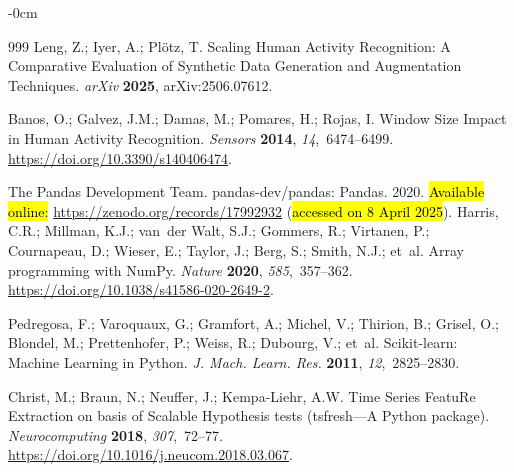 \documentclass[sensors,article,accept,pdftex,moreauthors]{Definitions/mdpi}
\begin{document}
\begin{adjustwidth}{-\extralength}{0cm}
\begin{thebibliography}{999}
Leng, Z.; Iyer, A.; Pl{\"o}tz, T.
 Scaling Human Activity Recognition: A Comparative Evaluation of
  Synthetic Data Generation and Augmentation Techniques.
 {\em arXiv} {\bf 2025}, arXiv:2506.07612.

Banos, O.; Galvez, J.M.; Damas, M.; Pomares, H.; Rojas, I.
 Window Size Impact in Human Activity Recognition.
 {\em Sensors} {\bf 2014}, {\em 14},~6474--6499.
 {\url{https://doi.org/10.3390/s140406474}}.

The Pandas Development Team. 
 pandas-dev/pandas: Pandas. 2020. 
 \hl{Available online:} %
{\url{https://zenodo.org/records/17992932}} (\hl{accessed on 8 April 2025}).%
Harris, C.R.; Millman, K.J.; van~der Walt, S.J.; Gommers, R.; Virtanen, P.;
  Cournapeau, D.; Wieser, E.; Taylor, J.; Berg, S.; Smith, N.J.;  et~al.
 Array programming with {NumPy}.
 {\em Nature} {\bf 2020}, {\em 585},~357--362.
 {\url{https://doi.org/10.1038/s41586-020-2649-2}}.

Pedregosa, F.; Varoquaux, G.; Gramfort, A.; Michel, V.; Thirion, B.; Grisel,
  O.; Blondel, M.; Prettenhofer, P.; Weiss, R.; Dubourg, V.;  et~al.
 Scikit-learn: Machine Learning in Python.
 {\em J. Mach. Learn. Res.} {\bf 2011}, {\em 12},~2825--2830.

Christ, M.; Braun, N.; Neuffer, J.; Kempa-Liehr, A.W.
 Time {Series} {FeatuRe} {Extraction} on basis of {Scalable}
  {Hypothesis} tests (tsfresh---{A} {Python} package).
 {\em Neurocomputing} {\bf 2018}, {\em 307},~72--77.
 {\url{https://doi.org/10.1016/j.neucom.2018.03.067}}.


\end{thebibliography}
\end{adjustwidth}
\end{document}
